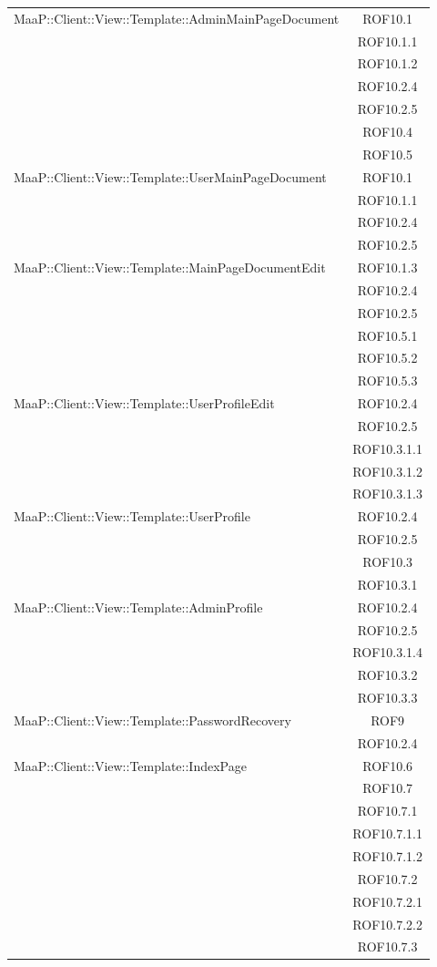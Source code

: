 \begin{center}
\begin{longtable}{|p{0.8\linewidth}|c|}
\midrule
MaaP::Client::View::Template::AdminMainPageDocument
& ROF10.1\\
& ROF10.1.1\\
& ROF10.1.2\\
& ROF10.2.4\\
& ROF10.2.5\\
& ROF10.4\\
& ROF10.5\\


\midrule
MaaP::Client::View::Template::UserMainPageDocument
& ROF10.1\\
& ROF10.1.1\\
& ROF10.2.4\\
& ROF10.2.5\\


\midrule
MaaP::Client::View::Template::MainPageDocumentEdit
& ROF10.1.3\\
& ROF10.2.4\\
& ROF10.2.5\\
& ROF10.5.1\\
& ROF10.5.2\\
& ROF10.5.3\\


\midrule
MaaP::Client::View::Template::UserProfileEdit
& ROF10.2.4\\
& ROF10.2.5\\
& ROF10.3.1.1\\
& ROF10.3.1.2\\
& ROF10.3.1.3\\

\midrule
MaaP::Client::View::Template::UserProfile
& ROF10.2.4\\
& ROF10.2.5\\
& ROF10.3\\
& ROF10.3.1\\

\midrule
MaaP::Client::View::Template::AdminProfile
& ROF10.2.4\\
& ROF10.2.5\\
& ROF10.3.1.4\\
& ROF10.3.2\\
& ROF10.3.3\\


\midrule
MaaP::Client::View::Template::PasswordRecovery
& ROF9\\
& ROF10.2.4\\

\midrule
MaaP::Client::View::Template::IndexPage
& ROF10.6\\
& ROF10.7\\
& ROF10.7.1\\
& ROF10.7.1.1\\
& ROF10.7.1.2\\
& ROF10.7.2\\
& ROF10.7.2.1\\
& ROF10.7.2.2\\
& ROF10.7.3\\


\end{longtable}
\end{center}
